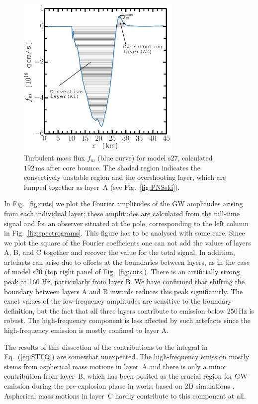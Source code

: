 \begin{figure}
\centering                                       
\includegraphics[width=0.7\textwidth]{./images/paper1/fig5.pdf}
\caption{Turbulent mass flux $f_m$ (blue curve) for model s27, calculated $192 \, \mathrm{ms}$ after core bounce.
The shaded region indicates the convectively unstable region and the overshooting layer, which
are lumped together as layer~A  (see Fig.~\ref{fig:PNSski}).
\label{fig:fm}}
\end{figure}

In Fig.~\ref{fig:cuts} we plot the Fourier amplitudes of the GW
amplitudes arising from each individual layer; these amplitudes are
calculated from the full-time signal and for an observer situated at
the pole, corresponding to the left column in
Fig.~\ref{fig:spectrograms}. This figure has to be analysed with some care. Since
we plot the square of the Fourier coefficients one can not add the values of layers A, B, and C 
together and recover the value for the total signal. In addition, artefacts can arise due to
effects at the boundaries between layers, as in the case of model s20 (top right panel of Fig.~\ref{fig:cuts}).
There is an artificially strong peak at 160 Hz, particularly from layer B. We have confirmed that shifting the 
boundary between layers A and B inwards reduces this peak significantly. The exact values of the low-frequency
amplitudes are sensitive to the boundary definition, but the fact that all three layers contribute to
emission below $250 \, \mathrm{Hz}$ is robust. The high-frequency component is less affected by such artefacts since the high-frequency emission is mostly confined to layer A.  

The results of this dissection of the
contributions to the integral in Eq.~(\ref{eq:STFQ}) are somewhat
unexpected.
The high-frequency emission  mostly stems from aspherical
mass motions in layer~A and there is only a
minor contribution from layer~B, which has been posited as
the crucial region for GW emission during the pre-explosion phase in
works based on 2D simulations \citep{marek_08,murphy_09,mueller_13}.
Aspherical mass motions in layer~C hardly contribute
to this component at all.

